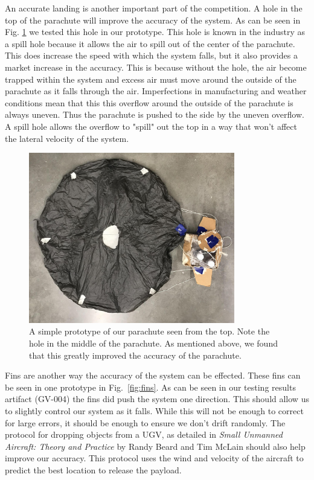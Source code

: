 \documentclass[]{auvsi_doc}
\begin{document}
An accurate landing is another important part of the competition. A hole in the top of the parachute will improve the accuracy of the system. As can be seen in Fig. \ref{fig:top} we tested this hole in our prototype. This hole is known in the industry as a spill hole because it allows the air to spill out of the center of the parachute. This does increase the speed with which the system falls, but it also provides a market increase in the accuracy. This is because without the hole, the air become trapped within the system and excess air must move around the outside of the parachute as it falls through the air. Imperfections in manufacturing and weather conditions mean that this this overflow around the outside of the  parachute is always uneven. Thus the parachute is pushed to the side by the uneven overflow. A spill hole allows the overflow to "spill" out the top in a way that won't affect the lateral velocity of the system.

\begin{figure}[ht]
\centering
\includegraphics[width=90mm]{./figs/Parachute_Top.jpg}
\caption{A simple prototype of our parachute seen from the top. Note the hole in the middle of the parachute. As mentioned above, we found that this greatly improved the accuracy of the parachute.}
\label{fig:top}
\end{figure}

Fins are another way the accuracy of the system can be effected. These fins can be seen in one prototype in Fig.~\ref{fig:fins}. As can be seen in our testing results artifact (GV-004) the fins did push the system one direction. This should allow us to slightly control our system as it falls. While this will not be enough to correct for large errors, it should be enough to ensure we don't drift randomly. The protocol for dropping objects from a UGV, as detailed in \textit{Small Unmanned Aircraft: Theory and Practice} by Randy Beard and Tim McLain should also help improve our accuracy. This protocol uses the wind and velocity of the aircraft to predict the best location to release the payload.
\end{document}
